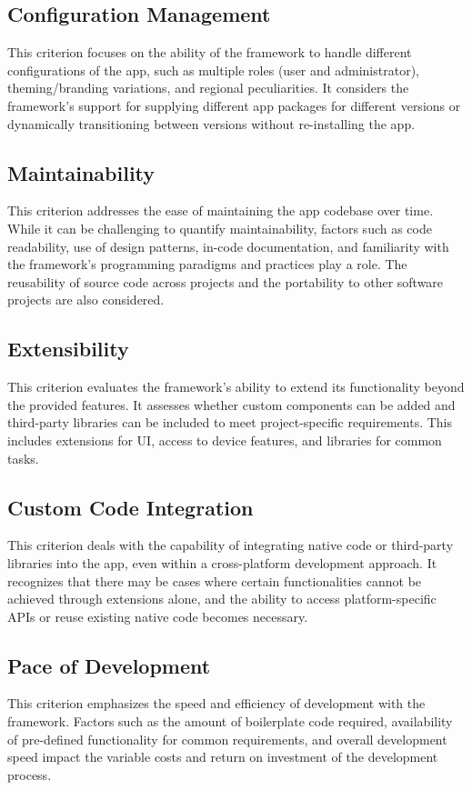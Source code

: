 \subsection{Configuration Management}
This criterion focuses on the ability of the framework to handle different configurations of the app, such as multiple roles (user and administrator), theming/branding variations, and regional peculiarities. It considers the framework's support for supplying different app packages for different versions or dynamically transitioning between versions without re-installing the app.

\subsection{Maintainability}
This criterion addresses the ease of maintaining the app codebase over time. While it can be challenging to quantify maintainability, factors such as code readability, use of design patterns, in-code documentation, and familiarity with the framework's programming paradigms and practices play a role. The reusability of source code across projects and the portability to other software projects are also considered.

\subsection{Extensibility}
This criterion evaluates the framework's ability to extend its functionality beyond the provided features. It assesses whether custom components can be added and third-party libraries can be included to meet project-specific requirements. This includes extensions for UI, access to device features, and libraries for common tasks.

\subsection{Custom Code Integration}
This criterion deals with the capability of integrating native code or third-party libraries into the app, even within a cross-platform development approach. It recognizes that there may be cases where certain functionalities cannot be achieved through extensions alone, and the ability to access platform-specific APIs or reuse existing native code becomes necessary.

\subsection{Pace of Development}
This criterion emphasizes the speed and efficiency of development with the framework. Factors such as the amount of boilerplate code required, availability of pre-defined functionality for common requirements, and overall development speed impact the variable costs and return on investment of the development process.

